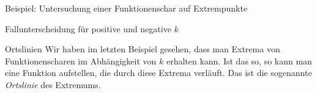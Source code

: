 \begin{bla}{Beispiel: Untersuchung einer Funktionenschar auf Extrempunkte}
\begin{marginfigure}[-25em]
    \caption{Fallunterscheidung für positive und negative $k$}
  \end{marginfigure}
\end{bla}

\begin{bla}{Ortslinien}
  Wir haben im letzten Beispiel gesehen, dass man Extrema von Funktionenscharen im Abhängigkeit von $k$ erhalten kann. Ist das so, so kann man eine Funktion aufstellen, die durch diese Extrema verläuft. Das ist die sogenannte \emph{Ortslinie} des Extremums.
\end{bla}

